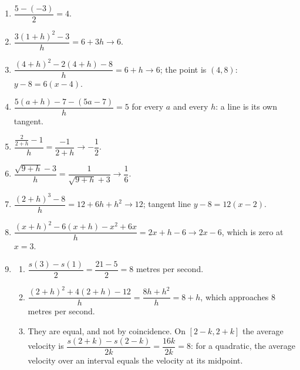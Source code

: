 \documentclass[11pt]{article}
\begin{document}
\newpage
\begin{solbox}
\begin{enumerate}[leftmargin=*,itemsep=4pt]
  \item $\dfrac{5-(-3)}{2}=4$.
  \item $\dfrac{3(1+h)^2-3}{h}=6+3h\to6$.
  \item $\dfrac{(4+h)^2-2(4+h)-8}{h}=6+h\to6$; the point is $(4,8)$: $y-8=6(x-4)$.
  \item $\dfrac{5(a+h)-7-(5a-7)}{h}=5$ for every $a$ and every $h$: a line is its own tangent.
  \item $\dfrac{\frac{2}{2+h}-1}{h}=\dfrac{-1}{2+h}\to-\dfrac12$.
  \item $\dfrac{\sqrt{9+h}-3}{h}=\dfrac{1}{\sqrt{9+h}+3}\to\dfrac16$.
  \item $\dfrac{(2+h)^3-8}{h}=12+6h+h^2\to12$; tangent line $y-8=12(x-2)$.
  \item $\dfrac{(x+h)^2-6(x+h)-x^2+6x}{h}=2x+h-6\to2x-6$, which is zero at $x=3$.
  \item \begin{enumerate}[label=(\alph*),leftmargin=*,itemsep=3pt]
    \item $\dfrac{s(3)-s(1)}{2}=\dfrac{21-5}{2}=8$ metres per second.
    \item $\dfrac{(2+h)^2+4(2+h)-12}{h}=\dfrac{8h+h^2}{h}=8+h$, which approaches 8 metres per second.
    \item They are equal, and not by coincidence. On $[2-k,2+k]$ the average velocity is $\dfrac{s(2+k)-s(2-k)}{2k}=\dfrac{16k}{2k}=8$: for a quadratic, the average velocity over an interval equals the velocity at its midpoint.
  \end{enumerate}
\end{enumerate}
\end{solbox}
\end{document}
